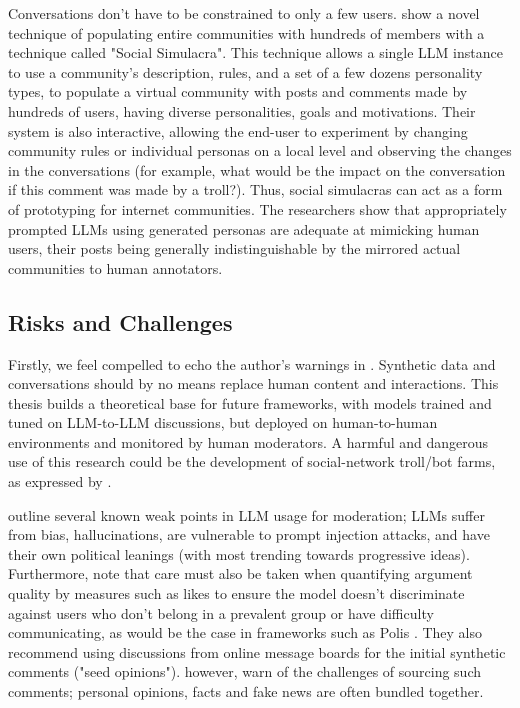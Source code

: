 Conversations don't have to be constrained to only a few users. \cite{park2022socialsimulacracreatingpopulated} show a novel technique of populating entire communities with hundreds of members with a technique called "Social Simulacra". This technique allows a single LLM instance to use a community's description, rules, and a set of a few dozens personality types, to populate a virtual community with posts and comments made by hundreds of users, having diverse personalities, goals and motivations. Their system is also interactive, allowing the end-user to experiment by changing community rules or individual personas on a local level and observing the changes in the conversations (for example, what would be the impact on the conversation if this comment was made by a troll?). Thus, social simulacras can act as a form of prototyping for internet communities. The researchers show that appropriately prompted LLMs using generated personas are adequate at mimicking human users, their posts being generally indistinguishable by the mirrored actual communities to human annotators.  


\subsection{Risks and Challenges}
\label{sec:related:challenges}

Firstly, we feel compelled to echo the author's warnings in \cite{small-polis-llm}. Synthetic data and conversations should by no means replace human content and interactions. This thesis builds a theoretical base for future frameworks, with models trained and tuned on LLM-to-LLM discussions, but deployed on human-to-human environments and monitored by human moderators. A harmful and dangerous use of this research could be the development of social-network troll/bot farms, as expressed by \cite{park2022socialsimulacracreatingpopulated}.

\cite{small-polis-llm} outline several known weak points in LLM usage for moderation; LLMs suffer from bias, hallucinations, are vulnerable to prompt injection attacks, and have their own political leanings (with most trending towards progressive ideas). Furthermore, \cite{vecchi-2021-towards} note that care must also be taken when quantifying argument quality by measures such as likes to ensure the model doesn't discriminate against users who don't belong in a prevalent group or have difficulty communicating, as would be the case in frameworks such as Polis \cite{small2021polis}. They also recommend using discussions from online message boards for the initial synthetic comments ("seed opinions"). \cite{vecchi-2021-towards} however, warn of the challenges of sourcing such comments; personal opinions, facts and fake news are often bundled together.

